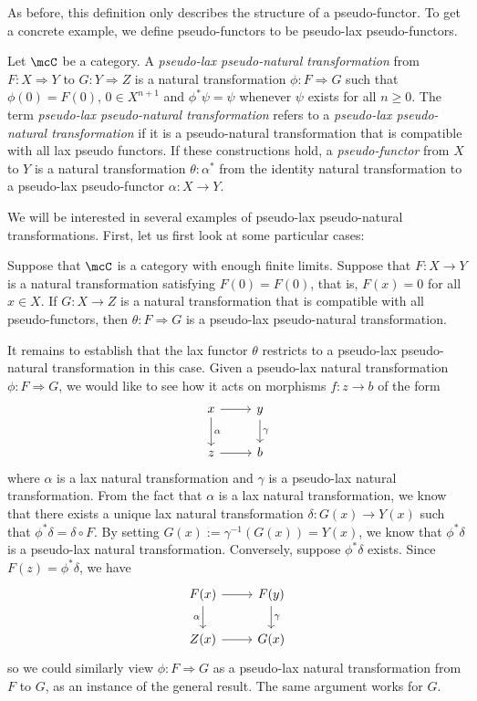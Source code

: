 \documentclass[a4paper,reqno,oneside]{article}
\begin{document}
As before, this definition only describes the structure of a pseudo-functor. To get a concrete example, we define pseudo-functors to be pseudo-lax pseudo-functors.

\begin{definition}\label{def:pseudo-lax-pseudo-natural-transformation}
	Let $\mcC$ be a category. A \textit{pseudo-lax pseudo-natural transformation} from $F : X \Rightarrow Y$ to $G : Y \Rightarrow Z$ is a natural transformation $\phi : F \Rightarrow G$ such that $\phi(0) = F(0)$, $0 \in X^{n+1}$ and $\phi^*\psi = \psi$ whenever $\psi$ exists for all $n \geq 0$. The term \textit{pseudo-lax pseudo-natural transformation} refers to a \textit{pseudo-lax pseudo-natural transformation} if it is a pseudo-natural transformation that is compatible with all lax pseudo functors. If these constructions hold, a \textit{pseudo-functor} from $X$ to $Y$ is a natural transformation $\theta : \alpha ^*$ from the identity natural transformation to a pseudo-lax pseudo-functor $\alpha : X \to Y$.
\end{definition}

We will be interested in several examples of pseudo-lax pseudo-natural transformations. First, let us first look at some particular cases:

\begin{proposition}
	Suppose that $\mcC$ is a category with enough finite limits. Suppose that $F : X \to Y$ is a natural transformation satisfying $F(0) = F(0)$, that is, $F(x) = 0$ for all $x \in X$. If $G : X \to Z$ is a natural transformation that is compatible with all pseudo-functors, then $\theta : F \Rightarrow G$ is a pseudo-lax pseudo-natural transformation.
\end{proposition}

It remains to establish that the lax functor $\theta$ restricts to a pseudo-lax pseudo-natural transformation in this case. Given a pseudo-lax natural transformation $\phi : F \Rightarrow G$, we would like to see how it acts on morphisms $f : z \to b$ of the form
\[
	\begin{tikzcd}
		x \ar[r] \ar[d, "\alpha"] & y \ar[d, "\gamma"] \\
		z \ar[r] & b
	\end{tikzcd}
\]
where $\alpha$ is a lax natural transformation and $\gamma$ is a pseudo-lax natural transformation. From the fact that $\alpha$ is a lax natural transformation, we know that there exists a unique lax natural transformation $\delta : G(x) \to Y(x)$ such that $\phi^*\delta = \delta \circ F$. By setting $G(x) := \gamma^{-1}(G(x)) = Y(x)$, we know that $\phi^*\delta$ is a pseudo-lax natural transformation. Conversely, suppose $\phi^*\delta$ exists. Since $F(z) = \phi^*\delta$, we have
\[
	\begin{tikzcd}
		F(x) \ar[r] \ar[d, "\alpha"'] & F(y) \ar[d, "\gamma"] \\
		Z(x) \ar[r] & G(x)
	\end{tikzcd}
\]
so we could similarly view $\phi : F \Rightarrow G$ as a pseudo-lax natural transformation from $F$ to $G$, as an instance of the general result. The same argument works for $G$.
\end{document}

